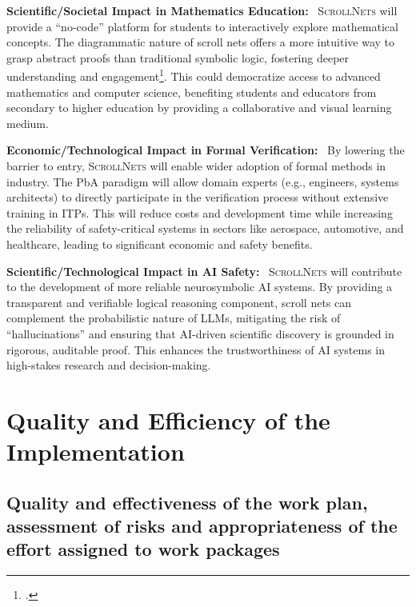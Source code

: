 \documentclass[11pt]{msca-pf}
\newcommand{\proj}{\small\textsc{ScrollNets}}
\begin{document}
\begin{description}
    \item \textbf{Scientific/Societal Impact in Mathematics Education:}~ {\proj} will provide a ``no-code''
    platform for students to interactively explore mathematical concepts. The diagrammatic nature of
    scroll nets offers a more intuitive way to grasp abstract proofs than traditional symbolic
    logic, fostering deeper understanding and engagement\footcite{minhResearchReportProof2024}. This
    could democratize access to advanced mathematics and computer science, benefiting students and
    educators from secondary to higher education by providing a collaborative and visual learning
    medium.

    \item \textbf{Economic/Technological Impact in Formal Verification:}~ By lowering the barrier to entry,
    {\proj} will enable wider adoption of formal methods in industry. The PbA paradigm will allow
    domain experts (e.g., engineers, systems architects) to directly participate in the verification
    process without extensive training in ITPs. This will reduce costs and development time while
    increasing the reliability of safety-critical systems in sectors like aerospace, automotive, and
    healthcare, leading to significant economic and safety benefits.

    \item \textbf{Scientific/Technological Impact in AI Safety:}~ {\proj} will contribute to the development
    of more reliable neurosymbolic AI systems. By providing a transparent and verifiable logical
    reasoning component, scroll nets can complement the probabilistic nature of LLMs, mitigating the
    risk of ``hallucinations'' and ensuring that AI-driven scientific discovery is grounded in
    rigorous, auditable proof. This enhances the trustworthiness of AI systems in high-stakes
    research and decision-making.
\end{description}

 

\section{Quality and Efficiency of the Implementation
            }
\label{sc:implementation}

\subsection{Quality and effectiveness of the work plan, assessment of risks and
    appropriateness of the effort assigned to work packages}
\label{ssc:implementation:workplan}
\end{document}
